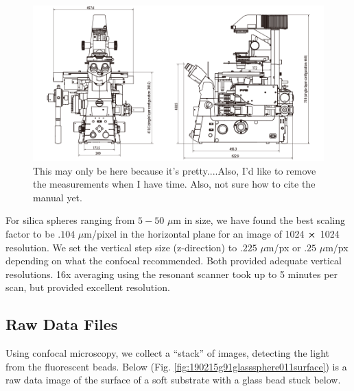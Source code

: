 \begin{figure}
	\centering
	\includegraphics[width=0.8\linewidth]{confocal_stuff/Ti2_diagram_1}
	\caption[Nikon Ti2 Microscope Base]{This may only be here because it's pretty....Also, I'd like to remove the measurements when I have time. Also, not sure how to cite the manual yet.}
	\label{fig:ti2diagram1}
\end{figure}

For silica spheres ranging from $5-50$ $\mu$m in size, we have found the best scaling factor to be $.104$ $\mu$m/pixel in the horizontal plane for an image of 1024 $ \cross $ 1024 resolution. We set the vertical step size (z-direction) to $.225$ $\mu$m/px or $.25$ $\mu$m/px depending on what the confocal recommended. Both provided adequate vertical resolutions. 16x averaging using the resonant scanner took up to 5 minutes per scan, but provided excellent resolution. 

\subsection{Raw Data Files}
Using confocal microscopy, we collect a ``stack'' of images, detecting the light from the fluorescent beads. Below (Fig. \ref{fig:190215g91glasssphere011surface}) is a raw data image of the surface of a soft substrate with a glass bead stuck below.


